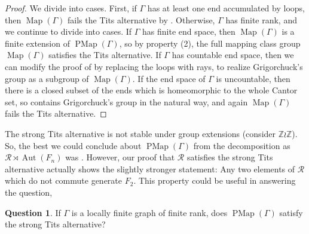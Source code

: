 \documentclass[11pt]{amsart}
\theoremstyle{plain}
\theoremstyle{definition}
\newtheorem{Q}[THM]{Question}
\DeclareMathOperator{\Aut}{Aut}
\DeclareMathOperator{\PMap}{PMap}
\DeclareMathOperator{\Map}{Map}
\newcommand{\Z}{\mathbb{Z}}
\newcommand{\cR}{\mathcal{R}}
\def\G{{\Gamma}}
\newcommand{\<}{\langle}
\renewcommand{\>}{\rangle}
\begin{document}
\begin{proof}
    We divide into cases. First, if $\G$ has at least one end accumulated by loops, then $\Map(\G)$ fails the Tits alternative by . Otherwise, $\G$ has finite rank, and we continue to divide into cases. If $\G$ has finite end space, then $\Map(\G)$ is a finite extension of $\PMap(\G)$, so by  property (2), the full mapping class group $\Map(\G)$ satisfies the Tits alternative. If $\G$ has countable end space, then we can modify the proof of  by replacing the loops with rays, to realize Grigorchuck's group as a subgroup of $\Map(\G)$. If the end space of $\G$ is uncountable, then there is a closed subset of the ends which is homeomorphic to the whole Cantor set, so contains Grigorchuck's group in the natural way, and again $\Map(\G)$ fails the Tits alternative. 
\end{proof}


The strong Tits alternative is not stable under group extensions (consider $\Z\wr \Z$). So, the best we could conclude about $\PMap(\G)$ from the decomposition as $\cR \rtimes \Aut(F_n)$ was .
However, our proof that $\cR$ satisfies the strong Tits alternative actually shows the slightly stronger statement: Any two elements of $\mathcal{R}$ which do not commute generate $F_2$. This property could be useful in answering the question, \begin{Q}\label{q:strongTA}
    If $\G$ is a locally finite graph of finite rank, does $\PMap(\G)$ satisfy the strong Tits alternative?
\end{Q}




\end{document}
